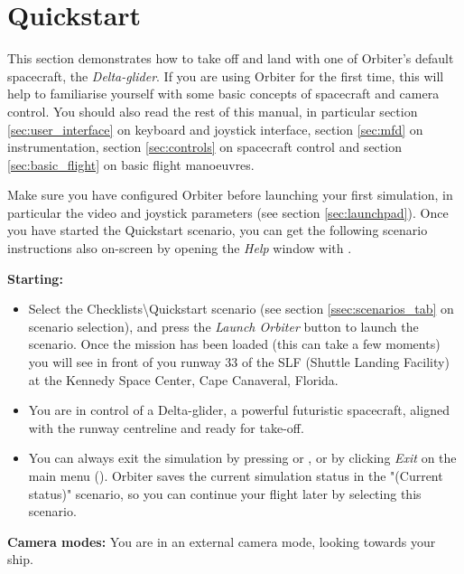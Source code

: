 \documentclass[Orbiter User Manual.tex]{subfiles}
\begin{document}
\section{Quickstart}
\label{sec:quickstart}

This section demonstrates how to take off and land with one of Orbiter's default
spacecraft, the \emph{Delta-glider}. If you are using Orbiter for the first
time, this will help to familiarise yourself with some basic concepts of
spacecraft and camera control. You should also read the rest of this manual, in
particular section \ref{sec:user_interface} on keyboard and joystick interface,
section \ref{sec:mfd} on instrumentation, section \ref{sec:controls} on
spacecraft control and section \ref{sec:basic_flight} on basic flight
manoeuvres.

Make sure you have configured Orbiter before launching your first simulation, in
particular the video and joystick parameters (see section \ref{sec:launchpad}).
Once you have started the Quickstart scenario, you can get the following
scenario instructions also on-screen by opening the \emph{Help} window with
.

\textbf{Starting:}
\begin{itemize}
	\item Select the Checklists\textbackslash Quickstart scenario (see section
		\ref{ssec:scenarios_tab} on scenario selection), and press the
		\emph{Launch Orbiter} button to launch the scenario. Once the mission
		has been loaded (this can take a few moments) you will see in front of
		you runway 33 of the SLF (Shuttle Landing Facility) at the Kennedy Space
		Center, Cape Canaveral, Florida.
	\item You are in control of a Delta-glider, a powerful futuristic
		spacecraft, aligned with the runway centreline and ready for take-off.
	\item You can always exit the simulation by pressing  or
		, or by clicking \emph{Exit} on the main menu
		(). Orbiter saves the current simulation status in the
		"(Current status)" scenario, so you can continue your flight later by
		selecting this scenario.
\end{itemize}

\textbf{Camera modes:}
You are in an external camera mode, looking towards your ship.
\end{document}
